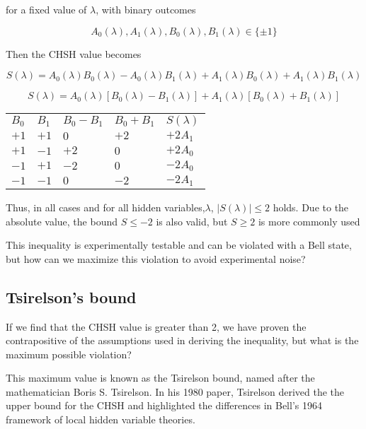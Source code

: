 \documentclass[12pt]{article}
\begin{document}
for a fixed value of $\lambda$, with binary outcomes

$$
A_0(\lambda), A_1(\lambda), B_0(\lambda), B_1(\lambda) \in \{\pm1\}
$$

Then the CHSH value becomes

$$
S(\lambda) = A_0(\lambda)B_0(\lambda) - A_0(\lambda)B_1(\lambda) + A_1(\lambda)B_0(\lambda) + A_1(\lambda)B_1(\lambda)
$$

$$
S(\lambda)= A_0(\lambda) [B_0(\lambda) - B_1(\lambda)] + A_1(\lambda) [B_0(\lambda) + B_1(\lambda)]
$$

\begin{center}
\begin{tabular}{
  |>{\centering\arraybackslash}p{1.5cm}  %
  |>{\centering\arraybackslash}p{1.5cm} 
  |>{\centering\arraybackslash}p{1.5cm} 
  |>{\centering\arraybackslash}p{1.5cm} 
  |>{\centering\arraybackslash}p{1.5cm}| 
}
 \hline
 \multicolumn{5}{|c|}{All possible permutations} \\
 \hline
 \(B_0\) & \(B_1\) & \(B_0 - B_1\) & \(B_0 + B_1\) & \(S(\lambda)\) \\
 \hline
 \(+1\)   &  \(+1\)    & \(0\) &  \(+2\) & \(+2A_1\) \\
 \(+1\)   &  \(-1\)    & \(+2\)&  \(0\) & \(+2A_0\) \\
 \(-1\)   &  \(+1\)    & \(-2\)&  \(0\) & \(-2A_0\) \\
 \(-1\)   &  \(-1\)    & \(0\) &  \(-2\) & \(-2A_1\) \\
 \hline
\end{tabular}
\end{center}

Thus, in all cases and for all hidden variables,$\lambda$, $|S(\lambda)| \leq 2$ holds. Due to the absolute value, the bound $S \leq -2$ is also valid, but $S \geq 2$ is more commonly used

This inequality is experimentally testable and can be violated with a Bell state, but how can we maximize this violation to avoid experimental noise?

\subsection{Tsirelson’s bound}

If we find that the CHSH value is greater than 2, we have proven the contrapositive of the assumptions used in deriving the inequality, but what is the maximum possible violation? 

This maximum value is known as the Tsirelson bound, named after the mathematician Boris S. Tsirelson. In his 1980 paper, Tsirelson derived the the upper bound for the CHSH and highlighted the differences in Bell's 1964 framework of local hidden variable theories. \cite{Tsirelson_Paper} \cite{Bell1964}
\end{document}

